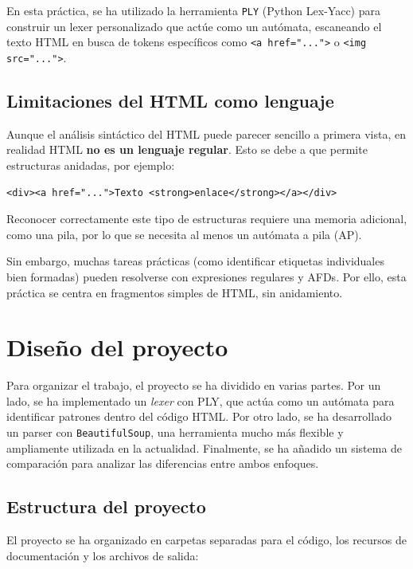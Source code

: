 \documentclass[11pt,a4paper]{article}
\begin{document}
En esta práctica, se ha utilizado la herramienta \texttt{PLY} (Python Lex-Yacc) para construir un lexer personalizado que actúe como un autómata, escaneando el texto HTML en busca de tokens específicos como \texttt{<a href="...">} o \texttt{<img src="...">}.

\subsection{Limitaciones del HTML como lenguaje}

Aunque el análisis sintáctico del HTML puede parecer sencillo a primera vista, en realidad HTML \textbf{no es un lenguaje regular}. Esto se debe a que permite estructuras anidadas, por ejemplo:

\begin{verbatim}
<div><a href="...">Texto <strong>enlace</strong></a></div>
\end{verbatim}

Reconocer correctamente este tipo de estructuras requiere una memoria adicional, como una pila, por lo que se necesita al menos un autómata a pila (AP).

Sin embargo, muchas tareas prácticas (como identificar etiquetas individuales bien formadas) pueden resolverse con expresiones regulares y AFDs. Por ello, esta práctica se centra en fragmentos simples de HTML, sin anidamiento.

\section{Diseño del proyecto}

Para organizar el trabajo, el proyecto se ha dividido en varias partes. Por un lado, se ha implementado un \textit{lexer} con PLY, que actúa como un autómata para identificar patrones dentro del código HTML. Por otro lado, se ha desarrollado un parser con \texttt{BeautifulSoup}, una herramienta mucho más flexible y ampliamente utilizada en la actualidad. Finalmente, se ha añadido un sistema de comparación para analizar las diferencias entre ambos enfoques.

\subsection{Estructura del proyecto}

El proyecto se ha organizado en carpetas separadas para el código, los recursos de documentación y los archivos de salida:
\end{document}
